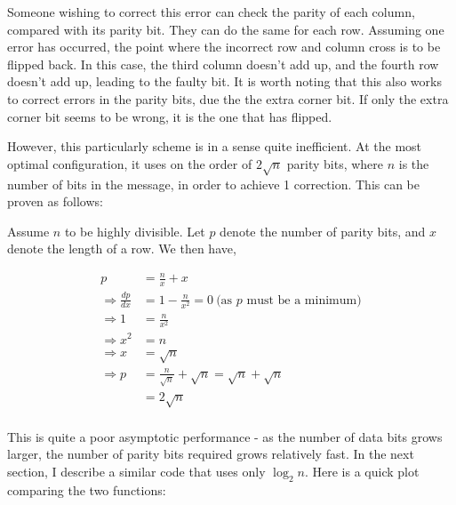 \documentclass{article}
\begin{document}
    Someone wishing to correct this error can check the parity of each column,
    compared with its parity bit. They can do the same for each row. Assuming
    one error has occurred, the point where the incorrect row and column cross
    is to be flipped back. In this case, the third column doesn't add up, and
    the fourth row doesn't add up, leading to the faulty bit. It is worth
    noting that this also works to correct errors in the parity bits, due the
    the extra corner bit. If only the extra corner bit seems to be wrong, it is
    the one that has flipped.

    However, this particularly scheme is in a sense quite inefficient. At the
    most optimal configuration, it uses on the order of $2\sqrt{n}$ parity bits,
    where $n$ is the number of bits in the message, in order to achieve 1
    correction. This can be proven as follows:

    Assume $n$ to be highly divisible. Let $p$ denote the number of parity
    bits, and $x$ denote the length of a row. We then have,

    \begin{align*}
        p &= \frac{n}{x} + x \\
        \Rightarrow \frac{dp}{dx} &= 1 - \frac{n}{x^2}
                    = 0\ \text{(as $p$ must be a minimum)}\\
        \Rightarrow 1 &= \frac{n}{x^2} \\
        \Rightarrow x^2 &= n \\
        \Rightarrow x &= \sqrt{n} \\
        \Rightarrow p &= \frac{n}{\sqrt{n}} + \sqrt{n} = \sqrt{n} + \sqrt{n} \\
                      &= 2\sqrt{n} \\
    \end{align*}

    This is quite a poor asymptotic performance - as the number of data bits
    grows larger, the number of parity bits required grows relatively fast. In
    the next section, I describe a similar code that uses only $\log_2 n$. Here
    is a quick plot comparing the two functions:

\begin{center}
\end{center}
\end{document}
